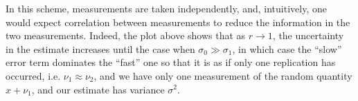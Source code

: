 \documentclass{homework}
\begin{document}
\begin{minipage}{.5\textwidth}
\end{minipage}
\hspace{1em}
\begin{minipage}{.5\textwidth}
In this scheme, measurements are taken independently, and, intuitively, one would expect correlation between measurements to reduce the information in the two measurements.  
Indeed, the plot above shows that as $r\to1$, the uncertainty in the estimate increases until the case when $\sigma_0 \gg \sigma_1$, in which case the ``slow'' error term dominates the ``fast'' one so that it is as if only one replication has occurred, i.e. $\nu_1 \approx \nu_2$, and we have only one measurement of the random quantity $x + \nu_1$, and our estimate has variance $\sigma^2$.
\end{minipage}


\end{document}

